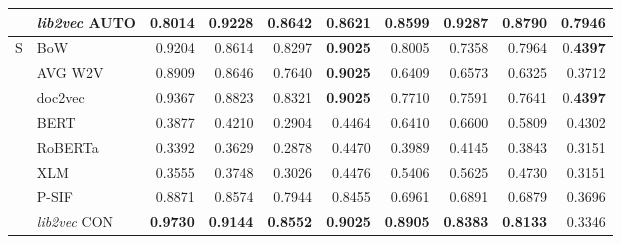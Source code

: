 \documentclass[11pt]{article}
\begin{document}
\begin{table}[ht!]
\begin{tabular}{L{0.3cm}lrrrrrrrr}
		& \emph{lib2vec} AUTO &  \textbf{0.8014} &     \textbf{0.9228} &      \textbf{0.8642} &     \textbf{0.8621} &        \textbf{0.8599} &              \textbf{0.9287} &               \textbf{0.8790} &              \textbf{0.7946} \\
		\midrule
		S 	& BoW &  0.9204 &     0.8614 &      0.8297 &     \textbf{0.9025} &        0.8005 &              0.7358 &               0.7964 &              0.\textbf{4397} \\
		& AVG W2V &  0.8909 &     0.8646 &      0.7640 &     \textbf{0.9025} &        0.6409 &              0.6573 &               0.6325 &              0.3712 \\
		& doc2vec &  0.9367 &     0.8823 &      0.8321 &     \textbf{0.9025} &        0.7710 &              0.7591 &               0.7641 &              0.\textbf{4397} \\
		& BERT &  0.3877 &     0.4210 &      0.2904 &     0.4464 &        0.6410 &              0.6600 &               0.5809 &              0.4302 \\
		& RoBERTa &  0.3392 &     0.3629 &      0.2878 &     0.4470 &        0.3989 &              0.4145 &               0.3843 &              0.3151 \\
		& XLM &  0.3555 &     0.3748 &      0.3026 &     0.4476 &        0.5406 &              0.5625 &               0.4730 &              0.3151 \\
		& P-SIF &  0.8871 &     0.8574 &      0.7944 &     0.8455 &        0.6961 &              0.6891 &               0.6879 &              0.3696 \\
		& \emph{lib2vec} CON &  \textbf{0.9730} &     \textbf{0.9144} &      \textbf{0.8552} &     \textbf{0.9025} &        \textbf{0.8905} &              \textbf{0.8383} &               \textbf{0.8133} &              0.3346 \\

\end{tabular}
\end{table}
\end{document}
